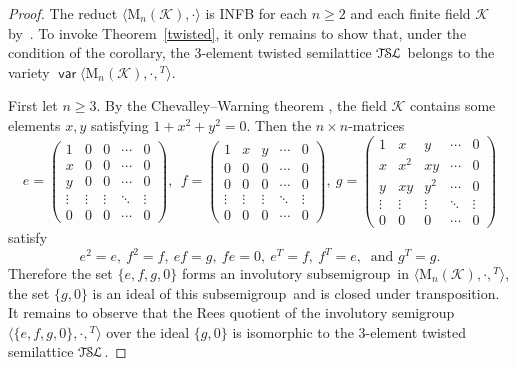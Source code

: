 \documentclass[11pt,reqno]{amsart}
\newcommand{\sgp}{semi\-group}
\newcommand{\is}{involutory semi\-group}
\newcommand{\TSL}{\ensuremath{\mathcal{T\kern-.5pt S\kern-.5pt L}}}
\DeclareMathOperator{\var}{\mathsf{var}}
\begin{document}
\begin{proof}
The reduct $\langle\mathrm{M}_n(\mathcal{K}),\cdot\rangle$ is INFB for each $n\ge2$ and each finite field $\mathcal{K}$
by~\cite[Corollary~6.2]{sapirburnside}. To invoke Theorem~\ref{twisted}, it only remains to show that, under the condition of the
corollary, the 3-element twisted semilattice $\TSL$ belongs to the variety $\var\langle\mathrm{M}_n(\mathcal{K}),\cdot,{}^T\rangle$.

First let $n\ge3$. By the Chevalley--Warning theorem \cite[Corollary~2 in \S1.2]{Serre}, the field $\mathcal{K}$ contains some elements
$x,y$ satisfying $1+x^2+y^2=0$. Then the $n\times n$-matrices
$$e=\begin{pmatrix}
1 & 0 & 0 & \cdots & 0\\
x & 0 & 0 & \cdots & 0\\
y & 0 & 0 & \cdots & 0\\
\vdots & \vdots & \vdots &\ddots & \vdots\\
0 & 0 & 0 & \cdots & 0
\end{pmatrix},\ \ f=
\begin{pmatrix} 1 & x & y & \cdots & 0\\
0 & 0 & 0 & \cdots & 0\\
0 & 0 & 0 & \cdots & 0\\
\vdots & \vdots & \vdots &\ddots & \vdots\\
0 & 0 & 0 & \cdots & 0
\end{pmatrix},\
g=
\begin{pmatrix} 1 & x & y & \cdots & 0\\
x & x^2 & xy & \cdots & 0\\
y & xy & y^2 & \cdots & 0\\
\vdots & \vdots & \vdots &\ddots & \vdots\\
0 & 0 & 0 & \cdots & 0
\end{pmatrix}$$
satisfy
$$e^2=e,\ f^2=f,\ ef=g,\ fe=0,\ e^T=f,\ f^T=e,\ \text{ and } g^T=g.$$
Therefore the set $\{e,f,g,0\}$ forms an involutory sub\sgp\ in $\langle\mathrm{M}_n(\mathcal{K}),\cdot,{}^T\rangle$, the set $\{g,0\}$ is
an ideal of this sub\sgp\ and is closed under transposition. It remains to observe that the Rees quotient of the \is\
$\langle\{e,f,g,0\},\cdot,{}^T\rangle$ over the ideal $\{g,0\}$ is isomorphic to the 3-element twisted semilattice $\TSL$.


\end{proof}
\end{document}
